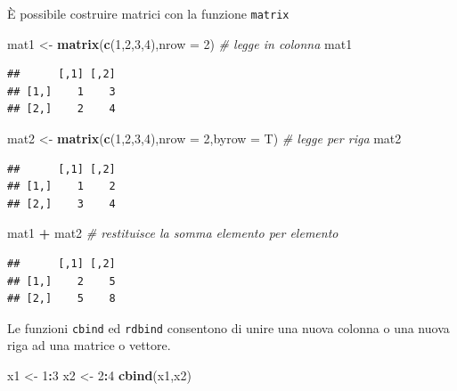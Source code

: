 \documentclass[
  11pt,
]{book}
\newenvironment{Shaded}{\begin{snugshade}}{\end{snugshade}}
\newcommand{\AttributeTok}[1]{\textcolor[rgb]{0.13,0.29,0.53}{#1}}
\newcommand{\CommentTok}[1]{\textcolor[rgb]{0.56,0.35,0.01}{\textit{#1}}}
\newcommand{\DecValTok}[1]{\textcolor[rgb]{0.00,0.00,0.81}{#1}}
\newcommand{\FunctionTok}[1]{\textcolor[rgb]{0.13,0.29,0.53}{\textbf{#1}}}
\newcommand{\NormalTok}[1]{#1}
\newcommand{\OtherTok}[1]{\textcolor[rgb]{0.56,0.35,0.01}{#1}}
\newcommand{\SpecialCharTok}[1]{\textcolor[rgb]{0.81,0.36,0.00}{\textbf{#1}}}
\theoremstyle{mytheoremstyle}
\theoremstyle{mydefstyle}
\begin{document}
È possibile costruire matrici con la funzione \texttt{matrix}

\begin{Shaded}
\begin{Highlighting}[]
\NormalTok{mat1 }\OtherTok{\textless{}{-}} \FunctionTok{matrix}\NormalTok{(}\FunctionTok{c}\NormalTok{(}\DecValTok{1}\NormalTok{,}\DecValTok{2}\NormalTok{,}\DecValTok{3}\NormalTok{,}\DecValTok{4}\NormalTok{),}\AttributeTok{nrow =} \DecValTok{2}\NormalTok{) }\CommentTok{\# legge in colonna}
\NormalTok{mat1}
\end{Highlighting}
\end{Shaded}

\begin{verbatim}
##      [,1] [,2]
## [1,]    1    3
## [2,]    2    4
\end{verbatim}

\begin{Shaded}
\begin{Highlighting}[]
\NormalTok{mat2 }\OtherTok{\textless{}{-}} \FunctionTok{matrix}\NormalTok{(}\FunctionTok{c}\NormalTok{(}\DecValTok{1}\NormalTok{,}\DecValTok{2}\NormalTok{,}\DecValTok{3}\NormalTok{,}\DecValTok{4}\NormalTok{),}\AttributeTok{nrow =} \DecValTok{2}\NormalTok{,}\AttributeTok{byrow =}\NormalTok{ T) }\CommentTok{\# legge per riga}
\NormalTok{mat2}
\end{Highlighting}
\end{Shaded}

\begin{verbatim}
##      [,1] [,2]
## [1,]    1    2
## [2,]    3    4
\end{verbatim}

\begin{Shaded}
\begin{Highlighting}[]
\NormalTok{mat1 }\SpecialCharTok{+}\NormalTok{ mat2 }\CommentTok{\# restituisce la somma elemento per elemento}
\end{Highlighting}
\end{Shaded}

\begin{verbatim}
##      [,1] [,2]
## [1,]    2    5
## [2,]    5    8
\end{verbatim}

Le funzioni \texttt{cbind} ed \texttt{rdbind} consentono di unire una nuova colonna o una nuova riga
ad una matrice o vettore.

\begin{Shaded}
\begin{Highlighting}[]
\NormalTok{x1 }\OtherTok{\textless{}{-}} \DecValTok{1}\SpecialCharTok{:}\DecValTok{3}
\NormalTok{x2 }\OtherTok{\textless{}{-}} \DecValTok{2}\SpecialCharTok{:}\DecValTok{4}
\FunctionTok{cbind}\NormalTok{(x1,x2)}
\end{Highlighting}
\end{Shaded}
\end{document}
